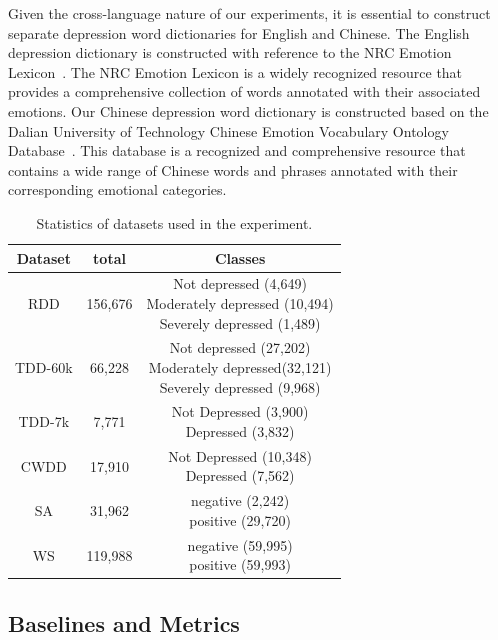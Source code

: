 \documentclass[runningheads]{llncs}
\begin{document}
Given the cross-language nature of our experiments, it is essential to construct separate depression word dictionaries for English and Chinese. The English depression dictionary is constructed with reference to the NRC Emotion Lexicon~\cite{mohammad2013nrc}. The NRC Emotion Lexicon is a widely recognized resource that provides a comprehensive collection of words annotated with their associated emotions. 
Our Chinese depression word dictionary is constructed based on the Dalian University of Technology Chinese Emotion Vocabulary Ontology Database~\cite{xu2008constructing}. This database is a recognized and comprehensive resource that contains a wide range of Chinese words and phrases annotated with their corresponding emotional categories.

\begin{table}
    \caption{Statistics of datasets used in the experiment.}
    \setlength{\tabcolsep}{9mm}
    \label{tab:1}
    \begin{tabular}{ccc}
    \toprule
        Dataset & total & Classes \\
    \midrule
        RDD & 156,676 &
        \makecell{Not depressed (4,649)\\ Moderately depressed (10,494)\\Severely depressed (1,489)} \\[10pt]
        TDD-60k& 66,228 & \makecell{Not depressed (27,202)\\ Moderately depressed(32,121)\\Severely depressed (9,968)} \\[10pt]
        TDD-7k & 7,771 & \makecell{Not Depressed (3,900)\\ Depressed (3,832)} \\
        CWDD & 17,910 & \makecell{Not Depressed (10,348)\\ Depressed (7,562)} \\
        \hline
        SA & 31,962 & \makecell{negative (2,242)\\ positive (29,720)} \\
        WS & 119,988 & \makecell{negative (59,995)\\ positive (59,993)} \\
    \bottomrule
    \end{tabular}\par\smallskip
\end{table}

\subsection{Baselines and Metrics}
\end{document}
